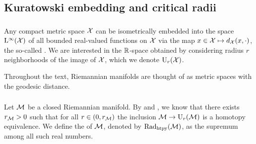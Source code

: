

\subsection{Kuratowski embedding and critical radii}\label{sub:filling radii}

\subsubsection{}

Any compact metric space $\mathcal{X}$ can be isometrically embedded into the space $\mathrm{L}^\infty(\mathcal{X})$ of all bounded real-valued functions on $\mathcal{X}$ via the map $x \in \mathcal{X} \mapsto d_{\mathcal{X}}(x,\cdot)$, the so-called .
We are interested in the \(\mathbb{R}\)-space obtained by considering radius \(r\) neighborhoods of the image of \(\mathcal{X}\), which we denote \(\mathrm{U}_r(\mathcal{X})\).

Throughout the text, Riemannian manifolds are thought of as metric spaces with the geodesic distance.

\subsubsection{}\label{ss:first_critical_value}

Let \(\mathcal{M}\) be a closed Riemannian manifold.
By \cite[Thm.~3.5]{hausmann1995vietoris} and \cite[Thm.~4.1]{lim2020vietoris}, we know that there exists \(r_{\mathcal{M}} > 0\) such that for all \(r \in (0,r_{\mathcal{M}})\) the inclusion \(\mathcal{M} \to \mathrm{U}_r(\mathcal{M})\) is a homotopy equivalence.
We define the  of \(\mathcal{M}\), denoted by \(\mathrm{Rad}_{\mathrm{htpy}}(\mathcal{M})\), as the supremum among all such real numbers.



\subsubsection{}

